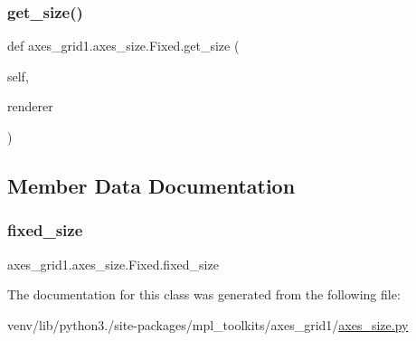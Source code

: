 \subsubsection{\texorpdfstring{get\+\_\+size()}{get\_size()}}
{\footnotesize\ttfamily def axes\+\_\+grid1.\+axes\+\_\+size.\+Fixed.\+get\+\_\+size (\begin{DoxyParamCaption}\item[{}]{self,  }\item[{}]{renderer }\end{DoxyParamCaption})}



\subsection{Member Data Documentation}
\mbox{\label{classaxes__grid1_1_1axes__size_1_1Fixed_a0f388282ddd82776e183d054fc310708}} 
\subsubsection{\texorpdfstring{fixed\+\_\+size}{fixed\_size}}
{\footnotesize\ttfamily axes\+\_\+grid1.\+axes\+\_\+size.\+Fixed.\+fixed\+\_\+size}



The documentation for this class was generated from the following file\+:\begin{DoxyCompactItemize}
\item 
venv/lib/python3./site-\/packages/mpl\+\_\+toolkits/axes\+\_\+grid1/\hyperlink{_2axes__size_8py}{axes\+\_\+size.\+py}\end{DoxyCompactItemize}

